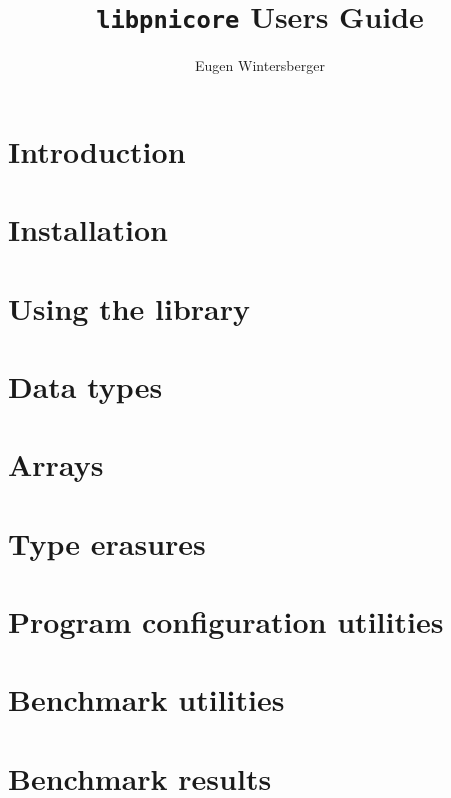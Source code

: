 \documentclass[a4paper,draft]{scrbook}
\title{{\Huge{\tt libpnicore} Users Guide}}
\author{Eugen Wintersberger}
\begin{document}
\maketitle
\tableofcontents

\chapter{Introduction}\label{chapter:introduction}

\FloatBarrier

\chapter{Installation}\label{chapter:installation}

\FloatBarrier

\chapter{Using the library}\label{chapter:using_library}

\FloatBarrier 

\chapter{Data types}\label{chapter:data_types}

\FloatBarrier

\chapter{Arrays}\label{chapter:arrays}

\FloatBarrier

\chapter{Type erasures}\label{chapter:type_erasures}

\FloatBarrier

\chapter{Program configuration utilities}\label{chapter:configuration}

\FloatBarrier

\chapter{Benchmark utilities}\label{chapter:benchmark}
\FloatBarrier

\appendix

\chapter{Benchmark results}

\FloatBarrier


\end{document}
